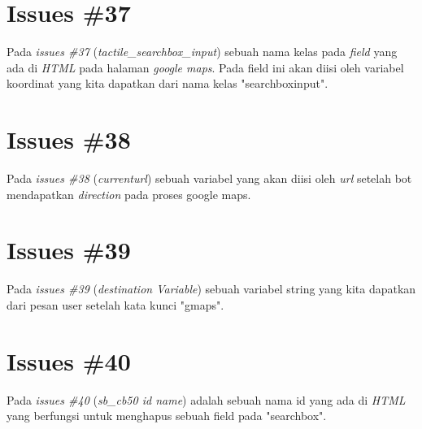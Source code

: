 \section{Issues \#37}
Pada \textit{issues \#37} (\textit{tactile\_searchbox\_input}) sebuah nama kelas pada \textit{field} yang ada di \textit{HTML} pada halaman \textit{google maps}. Pada field ini akan diisi oleh variabel koordinat yang kita dapatkan dari nama kelas "searchboxinput".

\section{Issues \#38}
Pada \textit{issues \#38} (\textit{currenturl}) sebuah variabel yang akan diisi oleh \textit{url} setelah bot mendapatkan \textit{direction} pada proses google maps.

\section{Issues \#39}
Pada \textit{issues \#39} (\textit{destination Variable}) sebuah variabel string yang kita dapatkan dari pesan user setelah kata kunci "gmaps".

\section{Issues \#40}
Pada \textit{issues \#40} (\textit{sb\_cb50 id name}) adalah sebuah nama id yang ada di \textit{HTML} yang berfungsi untuk menghapus sebuah field pada "searchbox".


